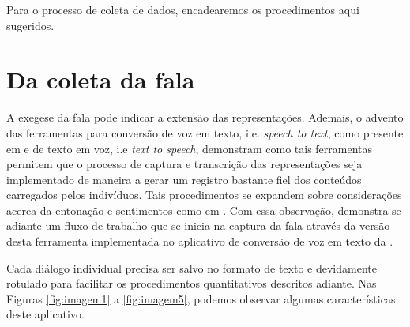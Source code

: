 \documentclass[
  12pt,       %
  openright,      %
  twoside,      %
  a4paper,      %
  english,      %
  french,       %
  spanish,      %
  brazil        %
  ]{abntex2}
\begin{document}
Para o processo de coleta de dados, encadearemos os procedimentos aqui sugeridos.


\section{Da coleta da fala}

A exegese da fala pode indicar a extensão das representações. Ademais, o advento das ferramentas para conversão de voz em texto, i.e. \textit{speech to text}, como presente em  e de texto em voz, i.e \textit{text to speech}, demonstram como tais ferramentas  permitem que o processo de captura e transcrição das representações seja implementado de maneira a gerar um registro bastante fiel dos conteúdos carregados pelos indivíduos. Tais procedimentos se expandem sobre considerações acerca da entonação e sentimentos como em . Com essa observação, demonstra-se adiante um fluxo de trabalho que se inicia na captura da fala através da versão desta ferramenta implementada no aplicativo de conversão de voz em texto da .

Cada diálogo individual precisa ser salvo no formato de texto e devidamente rotulado para facilitar os procedimentos quantitativos descritos adiante. Nas Figuras \ref{fig:imagem1} a \ref{fig:imagem5}, podemos observar algumas características deste aplicativo.
\end{document}
